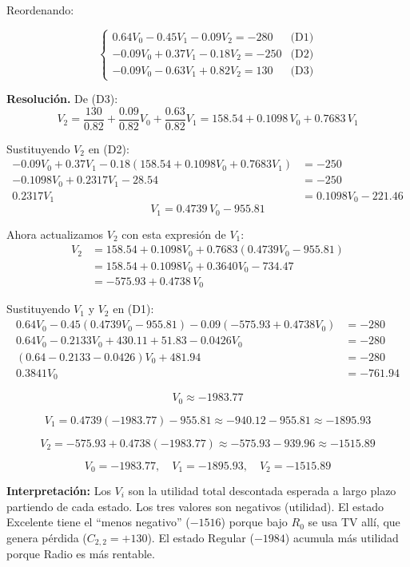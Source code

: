 \documentclass[12pt,a4paper]{article}
\begin{document}
Reordenando:

\[
\boxed{\begin{cases}
0.64V_0 - 0.45V_1 - 0.09V_2 = -280 & \text{(D1)}\\[4pt]
-0.09V_0 + 0.37V_1 - 0.18V_2 = -250 & \text{(D2)}\\[4pt]
-0.09V_0 - 0.63V_1 + 0.82V_2 = 130 & \text{(D3)}
\end{cases}}
\]

\textbf{Resolución.} De (D3):
\[
V_2 = \frac{130}{0.82} + \frac{0.09}{0.82}V_0 + \frac{0.63}{0.82}V_1
     = 158.54 + 0.1098\,V_0 + 0.7683\,V_1
\]

Sustituyendo $V_2$ en (D2):
\[
\begin{aligned}
-0.09V_0 + 0.37V_1 - 0.18(158.54 + 0.1098V_0 + 0.7683V_1) &= -250 \\
-0.1098V_0 + 0.2317V_1 - 28.54 &= -250 \\
0.2317V_1 &= 0.1098V_0 - 221.46
\end{aligned}
\]
\[
\boxed{V_1 = 0.4739\,V_0 - 955.81}
\]

Ahora actualizamos $V_2$ con esta expresión de $V_1$:
\[
\begin{aligned}
V_2 &= 158.54 + 0.1098V_0 + 0.7683(0.4739V_0 - 955.81) \\
    &= 158.54 + 0.1098V_0 + 0.3640V_0 - 734.47 \\
    &= -575.93 + 0.4738\,V_0
\end{aligned}
\]

Sustituyendo $V_1$ y $V_2$ en (D1):
\[
\begin{aligned}
0.64V_0 - 0.45(0.4739V_0 - 955.81) - 0.09(-575.93 + 0.4738V_0) &= -280 \\
0.64V_0 - 0.2133V_0 + 430.11 + 51.83 - 0.0426V_0 &= -280 \\
(0.64 - 0.2133 - 0.0426)V_0 + 481.94 &= -280 \\
0.3841V_0 &= -761.94
\end{aligned}
\]

\[
\boxed{V_0 \approx -1983.77}
\]

\[
V_1 = 0.4739(-1983.77) - 955.81 \approx -940.12 - 955.81 \approx \boxed{-1895.93}
\]

\[
V_2 = -575.93 + 0.4738(-1983.77) \approx -575.93 - 939.96 \approx \boxed{-1515.89}
\]

\[
\boxed{ \boxed{ V_0 = -1983.77,\quad V_1 = -1895.93,\quad V_2 = -1515.89 } }
\]

\textbf{Interpretación:} Los $V_i$ son la utilidad total descontada esperada a largo plazo partiendo de cada estado. Los tres valores son negativos (utilidad). El estado Excelente tiene el ``menos negativo'' ($-1516$) porque bajo $R_0$ se usa TV allí, que genera pérdida ($C_{2,2}=+130$). El estado Regular ($-1984$) acumula más utilidad porque Radio es más rentable.
\end{document}
